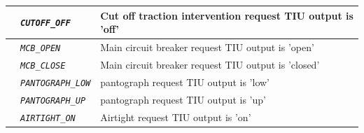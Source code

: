 \documentclass{template/openetcs}
\begin{document}
\begin{itemize}
\begin{longtable}{|l|l|l|}
			\hline

			&	\begin{minipage}[t]{0.40\linewidth} \emph{\texttt{CUTOFF\_OFF}} \end{minipage}
			&	\begin{minipage}[t]{0.38\linewidth} Cut off traction intervention request TIU output is ’off’ \end{minipage} \\ 

			\hline

			&	\begin{minipage}[t]{0.40\linewidth} \emph{\texttt{MCB\_OPEN}} \end{minipage}
			&	\begin{minipage}[t]{0.38\linewidth} Main circuit breaker request TIU output is ’open’ \end{minipage} \\ 

			\hline

			&	\begin{minipage}[t]{0.40\linewidth} \emph{\texttt{MCB\_CLOSE}} \end{minipage}
			&	\begin{minipage}[t]{0.38\linewidth} Main circuit breaker request TIU output is ’closed’ \end{minipage} \\ 

			\hline

			&	\begin{minipage}[t]{0.40\linewidth} \emph{\texttt{PANTOGRAPH\_LOW}} \end{minipage}
			&	\begin{minipage}[t]{0.38\linewidth} pantograph request TIU output is ’low’ \end{minipage} \\ 

			\hline

			&	\begin{minipage}[t]{0.40\linewidth} \emph{\texttt{PANTOGRAPH\_UP}} \end{minipage}
			&	\begin{minipage}[t]{0.38\linewidth} pantograph request TIU output is ’up’ \end{minipage} \\ 

			\hline

			&	\begin{minipage}[t]{0.40\linewidth} \emph{\texttt{AIRTIGHT\_ON}} \end{minipage}
			&	\begin{minipage}[t]{0.38\linewidth} Airtight request TIU output is ’on’ \end{minipage} \\ 


\end{longtable}
\end{itemize}
\end{document}
